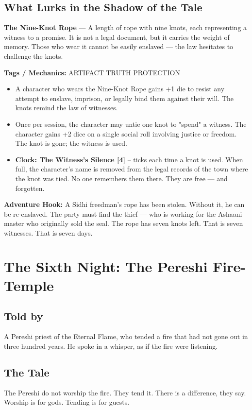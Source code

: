 \documentclass[10pt,twoside]{book}
\newcommand{\tag}[1]{\textsc{#1}}
\begin{document}
\section*{What Lurks in the Shadow of the Tale}
\begin{infobox}
\textbf{The Nine-Knot Rope} --- A length of rope with nine knots, each representing a witness to a promise. It is not a legal document, but it carries the weight of memory. Those who wear it cannot be easily enslaved --- the law hesitates to challenge the knots.

\textbf{Tags / Mechanics:} \tag{ARTIFACT} \tag{TRUTH} \tag{PROTECTION}

\begin{itemize}
\item A character who wears the Nine-Knot Rope gains +1 die to resist any attempt to enslave, imprison, or legally bind them against their will. The knots remind the law of witnesses.
\item Once per session, the character may untie one knot to "spend" a witness. The character gains +2 dice on a single social roll involving justice or freedom. The knot is gone; the witness is used.
\item \textbf{Clock: The Witness's Silence [4]} -- ticks each time a knot is used. When full, the character's name is removed from the legal records of the town where the knot was tied. No one remembers them there. They are free --- and forgotten.
\end{itemize}

\textbf{Adventure Hook:} A Sidhi freedman's rope has been stolen. Without it, he can be re-enslaved. The party must find the thief --- who is working for the Ashaani master who originally sold the seal. The rope has seven knots left. That is seven witnesses. That is seven days.
\end{infobox}

\chapter{The Sixth Night: The Pereshi Fire-Temple}

\section*{Told by}
A Pereshi priest of the Eternal Flame, who tended a fire that had not gone out in three hundred years. He spoke in a whisper, as if the fire were listening.

\section*{The Tale}
The Pereshi do not worship the fire. They tend it. There is a difference, they say. Worship is for gods. Tending is for guests.
\end{document}
